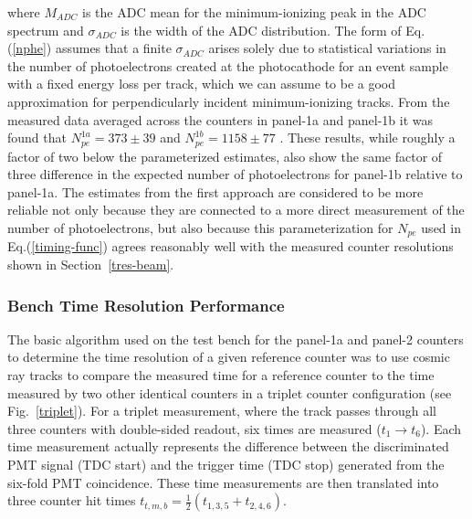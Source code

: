 \documentclass[final,3p,twocolumn]{elsarticle}
\begin{document}
\noindent
where $M_{ADC}$ is the ADC mean for the minimum-ionizing peak in the ADC spectrum and $\sigma_{ADC}$
is the width of the ADC distribution. The form of Eq.(\ref{nphe}) assumes that a finite $\sigma_{ADC}$
arises solely due to statistical variations in the number of photoelectrons created at the photocathode for
an event sample with a fixed energy loss per track, which we can assume to be a good approximation for
perpendicularly incident minimum-ionizing tracks. From the measured data averaged across the counters in
panel-1a and panel-1b it was found that $N_{pe}^{1a} = 373 \pm 39$ and $N_{pe}^{1b} = 1158 \pm 77$
\cite{pmt-currents}. These results, while roughly a factor of two below the parameterized estimates, also
show the same factor of three difference in the expected number of photoelectrons for panel-1b relative
to panel-1a. The estimates from the first approach are considered to be more reliable not only because they
are connected to a more direct measurement of the number of photoelectrons, but also because this
parameterization for $N_{pe}$ used in Eq.(\ref{timing-func}) agrees reasonably well with the measured
counter resolutions shown in Section~\ref{tres-beam}.

\subsubsection{Bench Time Resolution Performance}
\label{sec-bench}

The basic algorithm used on the test bench for the panel-1a and panel-2 counters to determine the time
resolution of a given reference counter was to use cosmic ray tracks to compare the measured time for a
reference counter to the time measured by two other identical counters in a triplet counter configuration
(see Fig.~\ref{triplet}). For a triplet measurement, where the track passes through all three counters with
double-sided readout, six times are measured ($t_1 \to t_6$). Each time measurement actually represents
the difference between the discriminated PMT signal (TDC start) and the trigger time (TDC stop)
generated from the six-fold PMT coincidence. These time measurements are then translated into three
counter hit times $t_{t,m,b} = \frac{1}{2}(t_{1,3,5} + t_{2,4,6})$.
\end{document}
